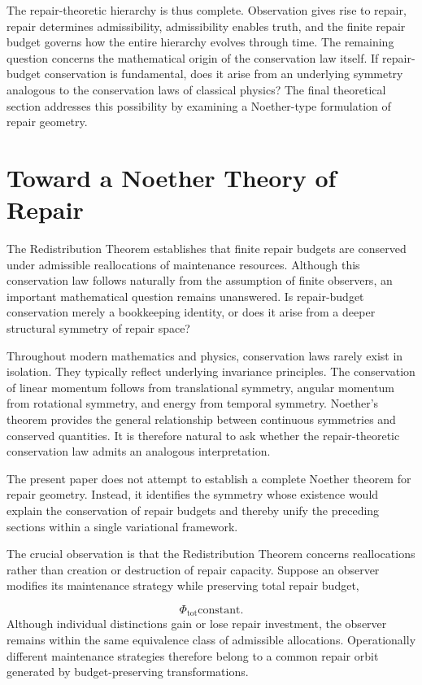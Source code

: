 \documentclass[12pt,oneside]{article}
\theoremstyle{plain}
\theoremstyle{definition}
\theoremstyle{remark}
\begin{document}
The repair-theoretic hierarchy is thus complete. Observation gives rise to repair, repair determines admissibility, admissibility enables truth, and the finite repair budget governs how the entire hierarchy evolves through time. The remaining question concerns the mathematical origin of the conservation law itself. If repair-budget conservation is fundamental, does it arise from an underlying symmetry analogous to the conservation laws of classical physics? The final theoretical section addresses this possibility by examining a Noether-type formulation of repair geometry.

\section{Toward a Noether Theory of Repair}

The Redistribution Theorem establishes that finite repair budgets are conserved under admissible reallocations of maintenance resources. Although this conservation law follows naturally from the assumption of finite observers, an important mathematical question remains unanswered. Is repair-budget conservation merely a bookkeeping identity, or does it arise from a deeper structural symmetry of repair space?

Throughout modern mathematics and physics, conservation laws rarely exist in isolation. They typically reflect underlying invariance principles. The conservation of linear momentum follows from translational symmetry, angular momentum from rotational symmetry, and energy from temporal symmetry. Noether's theorem provides the general relationship between continuous symmetries and conserved quantities. It is therefore natural to ask whether the repair-theoretic conservation law admits an analogous interpretation.

The present paper does not attempt to establish a complete Noether theorem for repair geometry. Instead, it identifies the symmetry whose existence would explain the conservation of repair budgets and thereby unify the preceding sections within a single variational framework.

The crucial observation is that the Redistribution Theorem concerns reallocations rather than creation or destruction of repair capacity. Suppose an observer modifies its maintenance strategy while preserving total repair budget,

\[
\Phi_{\mathrm{tot}}
\text{constant}.
\]
Although individual distinctions gain or lose repair investment, the observer remains within the same equivalence class of admissible allocations. Operationally different maintenance strategies therefore belong to a common repair orbit generated by budget-preserving transformations.
\end{document}
